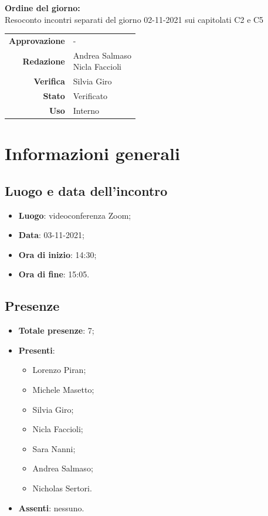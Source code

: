 \documentclass[11pt]{article}
\begin{document}
\begin{titlepage}
\begin{center}
			\large
			
			\vfill
			\textbf{Ordine del giorno:} \\
			Resoconto incontri separati del giorno 02-11-2021 sui capitolati C2 e C5
			\vfill
			
			\begin{tabular}{r|l}
				\textbf{Approvazione} &  -\\
				\textbf{Redazione} &  \parbox[t]{3.5cm}{Andrea Salmaso \\Nicla Faccioli}\\
				\textbf{Verifica} &  Silvia Giro\\
				\textbf{Stato} & Verificato \\
				\textbf{Uso} & Interno
			\end{tabular}
			\vfill
			
		\end{center}
	\end{titlepage}

	\newpage

	\section{Informazioni generali}
	\subsection{Luogo e data dell'incontro}
	\begin{itemize}
		\item \textbf{Luogo}: videoconferenza Zoom;
		\item \textbf{Data}: 03-11-2021;
		\item \textbf{Ora di inizio}: 14:30;
		\item \textbf{Ora di fine}: 15:05.
	\end{itemize}
	
	\subsection{Presenze}
	\begin{itemize}
		\item \textbf{Totale presenze}: 7;
		\item \textbf{Presenti}:
		\begin{itemize}
			\item Lorenzo Piran;
			\item Michele Masetto;
			\item Silvia Giro;
			\item Nicla Faccioli;
			\item Sara Nanni;
			\item Andrea Salmaso;
			\item Nicholas Sertori.		
		\end{itemize}
		\item \textbf{Assenti}: nessuno.
	\end{itemize}
\end{document}

